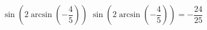  {$\sin\left(2\arcsin\left(-\dfrac{4}{5}\right)\right)$}
{ $\sin\left(2\arcsin\left(-\dfrac{4}{5}\right)\right)= -\dfrac{24}{25}$}
